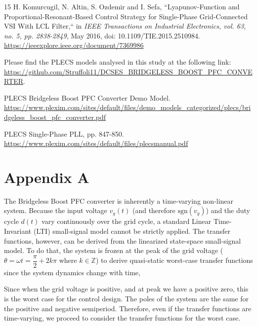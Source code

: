 \documentclass[DIV=calc, paper=a4, fontsize=11pt, twocolumn]{scrartcl}	 %
\begin{document}
\begin{thebibliography}{15}
H. Komurcugil, N. Altin, S. Ozdemir and I. Sefa, ``Lyapunov-Function and Proportional-Resonant-Based Control Strategy for Single-Phase Grid-Connected VSI With LCL Filter,`` in \emph{IEEE Transactions on Industrial Electronics, vol. 63, no. 5, pp. 2838-2849}, May 2016, doi: 10.1109/TIE.2015.2510984. \url{https://ieeexplore.ieee.org/document/7369986}

 Please find the PLECS models analysed in this study at the following link: \url{https://github.com/Struffoli11/DCSES_BRIDGELESS_BOOST_PFC_CONVERTER}.

 PLECS Bridgeless Boost PFC Converter Demo Model. \url{https://www.plexim.com/sites/default/files/demo_models_categorized/plecs/bridgeless_boost_pfc_converter.pdf}

 PLECS Single-Phase PLL, pp. 847-850. \url{https://www.plexim.com/sites/default/files/plecsmanual.pdf} 








\end{thebibliography}




\newpage
\textbf{ }
\newpage
\section*{Appendix A}
The Bridgeless Boost PFC converter is inherently a time-varying non-linear system. Because the input voltage $v_g(t)$ (and therefore $\text{sgn}(v_g)$) and the duty cycle $d(t)$ vary continuously over the grid cycle, a standard Linear Time-Invariant (LTI) small-signal model cannot be strictly applied.
The transfer functions, however, can be derived from the linearized state-space small-signal model. To do that, the system is frozen at the peak of the grid voltage ($\theta = \omega t =\dfrac{\pi}{2}+ 2k\pi$ where $k\in 
\mathbb{Z}$) to derive quasi-static worst-case transfer functions since the system dynamics change with time, 

Since when the grid voltage is positive, and at peak we have a positive zero, this is the worst case for the control design. The poles of the system are the same for the positive and negative semiperiod.
Therefore, even if the transfer functions are time-varying, we proceed to consider the transfer functions for the worst case.\\
\end{document}
